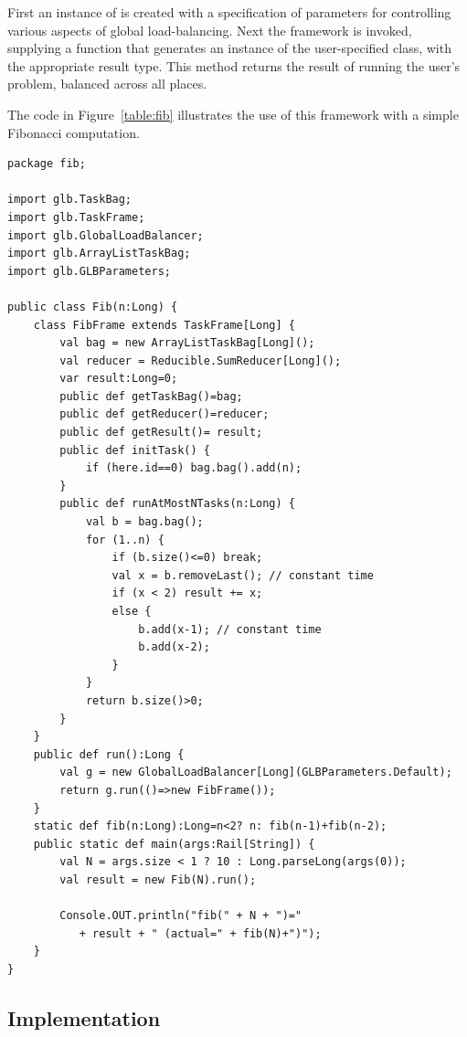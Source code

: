 \noindent First an instance of  is created
with a specification of parameters for controlling various aspects of
global load-balancing. Next the framework is invoked, supplying a
function that generates an instance of the user-specified
 class, with the appropriate result type. This method
returns the result of running the user's problem, balanced across all
places. 

The code in Figure~\ref{table:fib} illustrates the use of this
framework with a simple Fibonacci computation. 


\begin{table}
{\footnotesize
\begin{verbatim}
package fib;

import glb.TaskBag;
import glb.TaskFrame;
import glb.GlobalLoadBalancer;
import glb.ArrayListTaskBag;
import glb.GLBParameters;

public class Fib(n:Long) {
    class FibFrame extends TaskFrame[Long] {
        val bag = new ArrayListTaskBag[Long]();
        val reducer = Reducible.SumReducer[Long]();
        var result:Long=0;
        public def getTaskBag()=bag;
        public def getReducer()=reducer;
        public def getResult()= result;
        public def initTask() {
            if (here.id==0) bag.bag().add(n);
        }
        public def runAtMostNTasks(n:Long) {
            val b = bag.bag();
            for (1..n) {
                if (b.size()<=0) break;
                val x = b.removeLast(); // constant time
                if (x < 2) result += x;
                else {
                    b.add(x-1); // constant time
                    b.add(x-2);
                }
            }
            return b.size()>0;
        }
    }
    public def run():Long {
        val g = new GlobalLoadBalancer[Long](GLBParameters.Default);
        return g.run(()=>new FibFrame());
    }
    static def fib(n:Long):Long=n<2? n: fib(n-1)+fib(n-2);
    public static def main(args:Rail[String]) {
        val N = args.size < 1 ? 10 : Long.parseLong(args(0));
        val result = new Fib(N).run();
        
        Console.OUT.println("fib(" + N + ")=" 
           + result + " (actual=" + fib(N)+")");
    }
}
\end{verbatim}}
\caption{Fibonacci, with GLB}\label{table:fib}
\end{table}

\subsection{Implementation}

